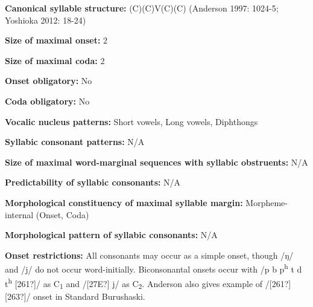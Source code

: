 \begin{styleBody}
\textbf{Canonical syllable structure:} (C)(C)V(C)(C)\textbf{ }(Anderson 1997: 1024-5; Yoshioka 2012: 18-24)
\end{styleBody}

\begin{styleBody}
\textbf{Size of maximal onset:} 2
\end{styleBody}

\begin{styleBody}
\textbf{Size of maximal coda:} 2
\end{styleBody}

\begin{styleBody}
\textbf{Onset obligatory:} No
\end{styleBody}

\begin{styleBody}
\textbf{Coda obligatory:} No
\end{styleBody}

\begin{styleBody}
\textbf{Vocalic nucleus patterns:} Short vowels, Long vowels, Diphthongs
\end{styleBody}

\begin{styleBody}
\textbf{Syllabic consonant patterns:} N/A
\end{styleBody}

\begin{styleBody}
\textbf{Size of maximal word{}-marginal sequences with syllabic obstruents:} N/A
\end{styleBody}

\begin{styleBody}
\textbf{Predictability of syllabic consonants:} N/A
\end{styleBody}

\begin{styleBody}
\textbf{Morphological constituency of maximal syllable margin:} Morpheme-internal (Onset, Coda)
\end{styleBody}

\begin{styleBody}
\textbf{Morphological pattern of syllabic consonants:} N/A
\end{styleBody}

\begin{styleBody}
\textbf{Onset restrictions: }All consonants may occur as a simple onset, though /ŋ/ and /j/ do not occur word-initially. Biconsonantal onsets occur with /p b p\textsuperscript{h} t d t\textsuperscript{h} [261?]/ as C\textsubscript{1} and /[27E?] j/ as C\textsubscript{2}. Anderson also gives example of /[261?][263?]/ onset in Standard Burushaski.
\end{styleBody}

